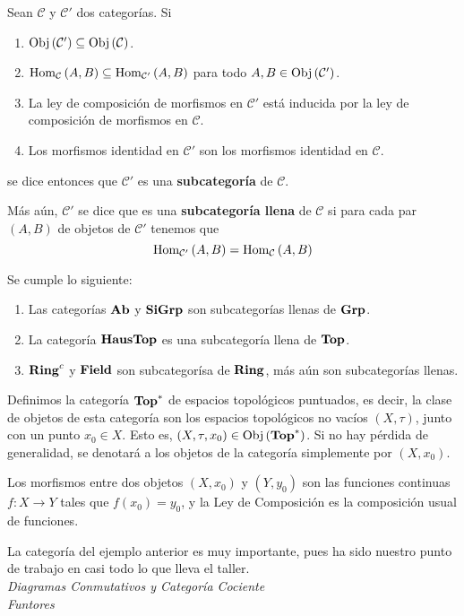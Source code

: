 \documentclass{article}
\newcounter{it}
\theoremstyle{largebreak}
\newcommand\subtitle[1]{\textit{\large #1}\\}
\newcommand\cf[3]{\ensuremath{#1:#2\rightarrow#3}}
\newcommand{\Obj}[1]{\ensuremath{\textup{Obj}\left(#1\right)}}
\newcommand{\Hom}[3]{\ensuremath{\textup{Hom}_{#1}\left(#2,#3\right)}}
\newcommand{\Cat}[1]{\ensuremath{\textup{\textbf{#1}}}}
\begin{document}
    \begin{mydef}
        Sean $\mathcal{C}$ y $\mathcal{C}'$ dos categorías. Si
        \begin{enumerate}
            \item $\Obj{\mathcal{C}'}\subseteq\Obj{\mathcal{C}}$.
            \item $\Hom{\mathcal{C}}{A}{B}\subseteq\Hom{\mathcal{C}'}{A}{B}$ para todo $A,B\in\Obj{\mathcal{C}'}$.
            \item La ley de composición de morfismos en $\mathcal{C}'$ está inducida por la ley de composición de morfismos en $\mathcal{C}$.
            \item Los morfismos identidad en $\mathcal{C}'$ son los morfismos identidad en $\mathcal{C}$.
        \end{enumerate}
        se dice entonces que $\mathcal{C}'$ es una \textbf{subcategoría} de $\mathcal{C}$.

        Más aún, $\mathcal{C}'$ se dice que es una \textbf{subcategoría llena} de $\mathcal{C}$ si para cada par $(A,B)$ de objetos de $\mathcal{C}'$ tenemos que
        \begin{equation*}
            \Hom{\mathcal{C}'}{A}{B}=\Hom{\mathcal{C}}{A}{B}
        \end{equation*}
    \end{mydef}

    \begin{exa}
        Se cumple lo siguiente:
        \begin{enumerate}
            \item Las categorías $\Cat{Ab}$ y $\Cat{SiGrp}$ son subcategorías llenas de $\Cat{Grp}$.
            \item La categoría $\Cat{HausTop}$ es una subcategoría llena de $\Cat{Top}$.
            \item $\Cat{Ring}^c$ y $\Cat{Field}$ son subcategorísa de $\Cat{Ring}$, más aún son subcategorías llenas.
        \end{enumerate}
    \end{exa}

    \begin{exa}
        Definimos la categoría $\Cat{Top}^*$ de espacios topológicos puntuados, es decir, la clase de objetos de esta categoría son los espacios topológicos no vacíos $(X,\tau)$, junto con un punto $x_0\in X$. Esto es, $(X,\tau,x_0)\in\Obj{\Cat{Top}^*}$. Si no hay pérdida de generalidad, se denotará a los objetos de la categoría simplemente por $(X,x_0)$.

        Los morfismos entre dos objetos $(X,x_0)$ y $(Y,y_0)$ son las funciones continuas $\cf{f}{X}{Y}$ tales que $f(x_0)=y_0$, y la Ley de Composición es la composición usual de funciones.
    \end{exa}

    La categoría del ejemplo anterior es muy importante, pues ha sido nuestro punto de trabajo en casi todo lo que lleva el taller.\\
    
    \subtitle{Diagramas Conmutativos y Categoría Cociente}


    \subtitle{Funtores}

\end{document}
